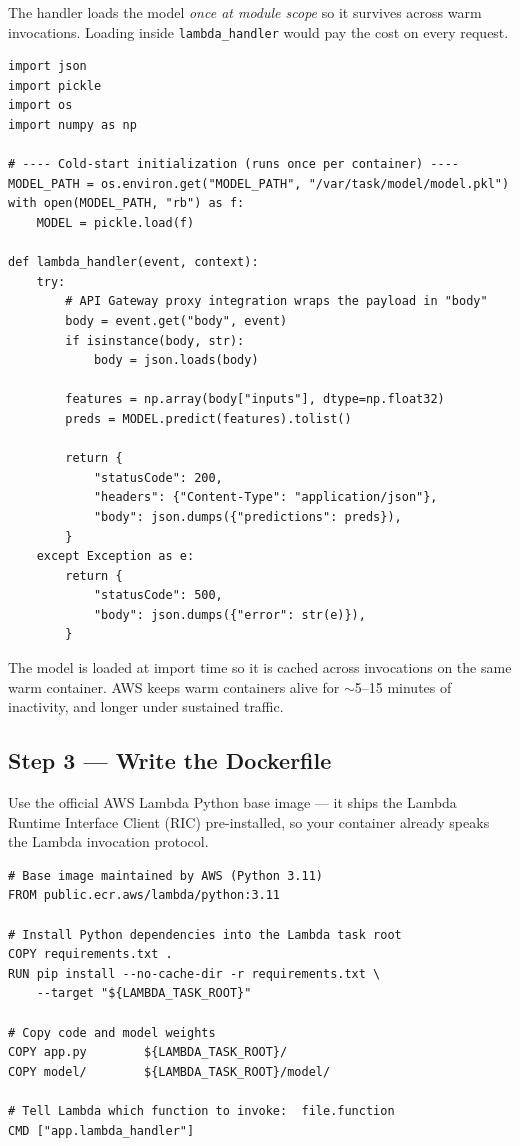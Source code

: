 \documentclass[11pt,a4paper]{article}
\begin{document}
The handler loads the model \emph{once at module scope} so it survives across
warm invocations. Loading inside \texttt{lambda\_handler} would pay the cost
on every request.

\begin{lstlisting}[style=pycode]
import json
import pickle
import os
import numpy as np

# ---- Cold-start initialization (runs once per container) ----
MODEL_PATH = os.environ.get("MODEL_PATH", "/var/task/model/model.pkl")
with open(MODEL_PATH, "rb") as f:
    MODEL = pickle.load(f)

def lambda_handler(event, context):
    try:
        # API Gateway proxy integration wraps the payload in "body"
        body = event.get("body", event)
        if isinstance(body, str):
            body = json.loads(body)

        features = np.array(body["inputs"], dtype=np.float32)
        preds = MODEL.predict(features).tolist()

        return {
            "statusCode": 200,
            "headers": {"Content-Type": "application/json"},
            "body": json.dumps({"predictions": preds}),
        }
    except Exception as e:
        return {
            "statusCode": 500,
            "body": json.dumps({"error": str(e)}),
        }
\end{lstlisting}

\begin{tipbox}
The model is loaded at import time so it is cached across invocations on the
same warm container. AWS keeps warm containers alive for $\sim$5--15 minutes of
inactivity, and longer under sustained traffic.
\end{tipbox}

\subsection{Step 3 --- Write the Dockerfile}

Use the official AWS Lambda Python base image --- it ships the Lambda Runtime
Interface Client (RIC) pre-installed, so your container already speaks the
Lambda invocation protocol.

\begin{lstlisting}[style=dockercode]
# Base image maintained by AWS (Python 3.11)
FROM public.ecr.aws/lambda/python:3.11

# Install Python dependencies into the Lambda task root
COPY requirements.txt .
RUN pip install --no-cache-dir -r requirements.txt \
    --target "${LAMBDA_TASK_ROOT}"

# Copy code and model weights
COPY app.py        ${LAMBDA_TASK_ROOT}/
COPY model/        ${LAMBDA_TASK_ROOT}/model/

# Tell Lambda which function to invoke:  file.function
CMD ["app.lambda_handler"]
\end{lstlisting}
\end{document}

